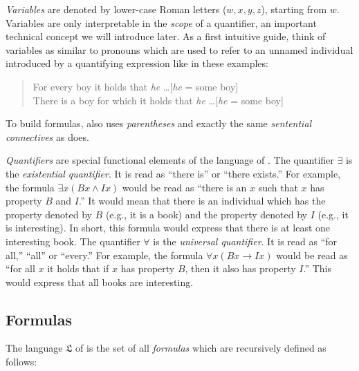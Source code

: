 \documentclass[nobib,nofonts]{tufte-handout}
\newcommand{\mygray}[1]{\textcolor{mygray2}{#1}}
\newcommand{\proplog}{\acro{PropLog}}
\newcommand{\predlog}{\acro{PredLog}}
\begin{document}
\emph{Variables} are denoted by lower-case Roman letters ($w, x,y,z$), starting from $w$.
Variables are only interpretable in the \emph{scope} of a quantifier, an important technical concept we will introduce later.
As a first intuitive guide, think of variables as similar to pronouns which are used to refer to an unnamed individual introduced by a quantifying expression like in these examples:

\begin{quote}
For every boy it holds that \emph{he} \dots \hfill \mygray{[\emph{he} = some boy]}\\
There is a boy for which it holds that \emph{he} \dots \hfill \mygray{[\emph{he} = some boy]}\\
\end{quote}

To build formulas, \predlog also uses \emph{parentheses} and exactly the same \emph{sentential connectives} as \proplog does.

\emph{Quantifiers} are special functional elements of the language of \predlog.
The quantifier $\exists$ is the \emph{existential quantifier}.
It is read as ``there is'' or ``there exists.''
For example, the formula $\exists x (Bx \wedge Ix)$ would be read as ``there is an $x$ such that $x$ has property $B$ and $I$.''
It would mean that there is an individual which has the property denoted by $B$ (e.g., it is a book) and the property denoted by $I$ (e.g., it is interesting).
In short, this formula would express that there is at least one interesting book.
The quantifier $\forall$ is the \emph{universal quantifier}.
It is read as ``for all,'' ``all'' or ``every.''
For example, the formula $\forall x (Bx \rightarrow Ix)$ would be read as ``for all $x$ it holds that if $x$ has property $B$, then it also has property $I$.''
This would express that all books are interesting.

\subsection{Formulas}
\label{sec:formulas}

The language $\mathfrak{L}$ of \predlog is the set of all \emph{formulas} which are recursively defined as follows:
\end{document}
